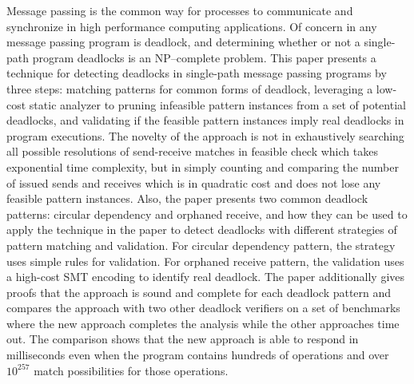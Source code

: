 Message passing is the common way for processes to communicate and synchronize in high performance computing applications. Of concern in
any message passing program is deadlock, and determining whether or not a single-path program deadlocks is an NP--complete problem. This paper
presents a technique for detecting deadlocks in single-path message passing programs by three steps: matching patterns for common forms of deadlock, leveraging a low-cost static analyzer to pruning infeasible pattern instances from a set of potential deadlocks, and validating if the feasible pattern instances imply real deadlocks in program executions. 
The novelty of the approach is not in exhaustively searching all possible resolutions of send-receive matches in feasible check which takes exponential time complexity, but in simply counting and comparing the number of issued sends and receives which is in quadratic cost and does not lose any feasible pattern instances.  
Also, the paper presents two common deadlock patterns: circular dependency and orphaned receive, and how they can be used to apply the technique in the paper to detect deadlocks with different strategies of pattern matching and validation. 
For circular dependency pattern, the strategy uses simple rules for validation. For orphaned receive pattern, the validation uses a high-cost SMT encoding to identify real deadlock. The paper additionally gives proofs that the approach is sound and complete for each deadlock pattern and compares the approach with two other deadlock verifiers on a set of benchmarks where the new approach completes the analysis while the other approaches time out. The comparison shows that the new approach is able to respond in milliseconds even when the program contains hundreds of operations and over $10^{257}$ match possibilities for those operations.
